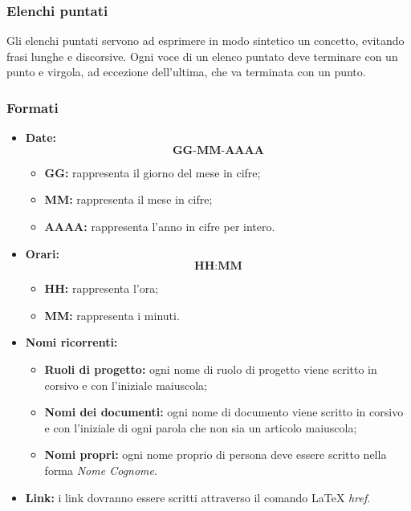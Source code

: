 \documentclass[./../NormediProgetto.tex]{subfiles}
\begin{document}
\subsubsection{Elenchi puntati}

 Gli elenchi puntati servono ad esprimere in modo sintetico un concetto, evitando frasi lunghe e discorsive. Ogni voce di un elenco puntato deve terminare con un punto e virgola, ad eccezione dell’ultima, che va terminata con un punto.

\subsubsection{Formati}

\begin{itemize}

\item{\textbf{Date:}}  \[\textbf{GG-MM-AAAA}\]
\begin{itemize}
\item{\textbf{GG:}} rappresenta il giorno del mese in cifre;
\item{\textbf{MM:}} rappresenta il mese in cifre;
\item{\textbf{AAAA:}} rappresenta l'anno in cifre per intero.

\end{itemize}

\item{\textbf{Orari:}} \[\textbf{HH:MM}\]
\begin{itemize}
\item{\textbf{HH:}} rappresenta l'ora;
\item{\textbf{MM:}} rappresenta i minuti.
\end{itemize}

\item{\textbf{Nomi ricorrenti:}}
\begin{itemize}
\item{\textbf{Ruoli di progetto:}} ogni nome di ruolo di progetto viene scritto in corsivo e con l’iniziale maiuscola;
\item{\textbf{Nomi dei documenti:}}  ogni nome di documento viene scritto in corsivo e con l’iniziale di ogni parola che non sia un articolo maiuscola;
\item{\textbf{Nomi propri:}} ogni nome proprio di persona deve essere scritto nella forma \textit{Nome Cognome}.
\end{itemize}

\item{\textbf{Link:}} i link dovranno essere scritti attraverso il comando \LaTeX{} \textit{href}.
\end{itemize}
\end{document}
